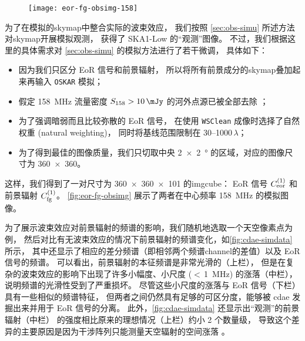 \begin{figure}[htp]
  \centering
  \texttt{[image: eor-fg-obsimg-158]}
  \label{fig:eor-fg-obsimg}
\end{figure}

为了在模拟的\ac{skymap}中整合实际的波束效应，
我们按照 \autoref{sec:obs-simu} 所述方法对\ac{skymap}开展模拟观测，
获得了 SKA1-Low 的\enquote{观测}图像。
不过，我们根据这里的具体需求对 \autoref{sec:obs-simu} 的模拟方法进行了若干微调，
具体如下：
\begin{itemize}
  \item 因为我们只区分 EoR 信号和前景辐射，
    所以将所有前景成分的\ac{skymap}叠加起来再输入 \texttt{OSKAR} 模拟；
  \item 假定 \SI{158}{\MHz} 流量密度 $S_{158} > \SI{10}{\mJy}$
    的河外点源已被全部去除 \cite{liu2009ps}；
  \item 为了强调暗弱而且比较弥散的 EoR 信号，
    在使用 \texttt{WSClean} 成像时选择了自然权重 (natural weighting)，
    同时将基线范围限制在 \numrange{30}{1000}$\,\lambda$；
  \item 为了得到最佳的图像质量，我们只切取中央 \SI{2 x 2}{\degree}
    的区域，对应的图像尺寸为 \num{360 x 360}。
\end{itemize}
这样，我们得到了一对尺寸为 \num{360 x 360 x 101} 的\ac{imgcube}：
EoR 信号 $C_{\mathrm{eor}}^{(1)}$ 和前景辐射 $C_{\mathrm{fg}}^{(1)}$。
\autoref{fig:eor-fg-obsimg} 展示了两者在中心频率 \SI{158}{\MHz} 的模拟图像。

为了展示波束效应对前景辐射的频谱的影响，我们随机地选取一个天空像素点为例，
然后对比有无波束效应的情况下前景辐射的频谱变化，如\autoref{fig:cdae-simdata} 所示，
其中还显示了相应的差分频谱（即相邻两个频谱\ac{channel}的差值）以及 EoR 信号的频谱。
可以看出，前景辐射的本征频谱是非常光滑的（上栏），
但是在复杂的波束效应的影响下出现了许多小幅度、小尺度 ($<$\,\SI{1}{\MHz}) 的涨落（中栏），
说明频谱的光滑性受到了严重损坏。
尽管这些小尺度的涨落与 EoR 信号（下栏）具有一些相似的频谱特征，
但两者之间仍然具有足够的可区分度，能够被 \ac{cdae} 发掘出来并用于 EoR 信号的分离。
此外，\autoref{fig:cdae-simdata} 还显示出\enquote{观测}的前景辐射（中栏）
的强度相比原来的理想情况（上栏）约小 2 个数量级，
导致这个差异的主要原因是因为干涉阵列只能测量天空辐射的空间涨落 \cite{braun1985}。

